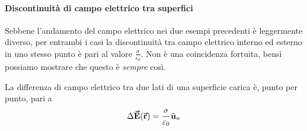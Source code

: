 \paragraph{Discontinuità di campo elettrico tra superfici}
Sebbene l'andamento del campo elettrico nei due esempi precedenti è leggermente diverso, per entrambi i casi la discontinuità tra campo elettrico interno ed esterno in uno stesso punto è pari al valore $\frac{\sigma}{\epsilon_0}$. Non è una coincidenza fortuita, bensì possiamo mostrare che questo è \textit{sempre} così.
\begin{proposition}
	La differenza di campo elettrico tra due lati di una superficie carica è, punto per punto, pari a 
	\begin{equation*}
		\Delta \vb*{\va{E}}(\vb*{\va{r}})=\frac{\sigma}{\varepsilon_0}\hat{\mathbf{u}}_n
	\end{equation*}
\end{proposition}
